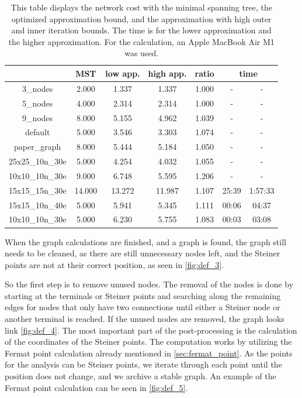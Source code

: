 \begin{table}[tb]
  \centering
  \setlength\tabcolsep{5pt} %
  \caption{
    \label{tab:cost}
    This table displays the network cost with the minimal spanning tree, the optimized approximation bound, and the approximation with high outer and inner iteration bounds. The time is for the lower approximation and the higher approximation. For the calculation, an Apple MacBook Air M1 was used.
  }  
  \begin{tabular}{c || c c c c c c}
    \toprule
     & \textbf{MST} & \textbf{low app.} & \textbf{high app.} & \textbf{ratio} & \multicolumn{2}{c}{\bfseries time} \\
     \hline
    3\_nodes & 2.000 & 1.337 & 1.337 & 1.000 & - & - \\
    5\_nodes & 4.000 & 2.314 & 2.314 & 1.000 & - & - \\
    9\_nodes & 8.000 & 5.155 & 4.962 & 1.039 & - & - \\
    default & 5.000 & 3.546 & 3.303 & 1.074 & - & - \\
    paper\_graph & 8.000 & 5.444 & 5.184 & 1.050 & - & - \\
    25x25\_10n\_30e & 5.000 & 4.254 & 4.032 & 1.055 & - & - \\
    10x10\_10n\_30e & 9.000 & 6.748 & 5.595 & 1.206 & - & - \\
    15x15\_15n\_30e & 14.000 & 13.272 & 11.987 & 1.107 & 25:39 & 1:57:33 \\
    15x15\_10n\_40e & 5.000 & 5.941 & 5.345 & 1.111 & 00:06 & 04:37 \\
    10x10\_10n\_30e & 5.000 & 6.230 & 5.755 & 1.083 & 00:03 & 03:08 \\
    \bottomrule
  \end{tabular}
\end{table}

When the graph calculations are finished, and a graph is found, the graph still needs to be cleaned, as there are still unnecessary nodes left, and the Steiner points are not at their correct position, as seen in \autoref{fig:def_3}.

So the first step is to remove unused nodes. The removal of the nodes is done by starting at the terminals or Steiner points and searching along the remaining edges for nodes that only have two connections until either a Steiner node or another terminal is reached. If the unused nodes are removed, the graph looks link \autoref{fig:def_4}.
The most important part of the post-processing is the calculation of the coordinates of the Steiner points. The computation works by utilizing the Fermat point calculation already mentioned in \autoref{sec:fermat_point}. As the points for the analysis can be Steiner points, we iterate through each point until the position does not change, and we archive a stable graph. An example of the Fermat point calculation can be seen in \autoref{fig:def_5}.

